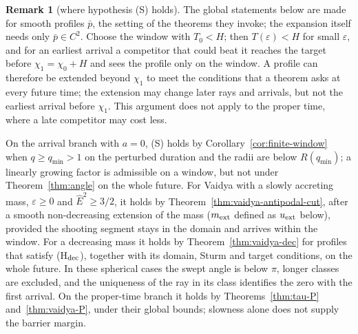 \documentclass[aip,jmp,amsmath,amssymb,reprint]{revtex4-2}
\newcommand{\Ehat}{\hat E}
\theoremstyle{plain}
\theoremstyle{definition}
\newtheorem{remark}[proposition]{Remark}
\begin{document}
\begin{remark}[where hypothesis (S) holds]\label{rmk:adiabatic-selection}
The global statements below are made for smooth profiles $\bar p$, the setting of the theorems they
invoke; the expansion itself needs only $\bar p\in C^2$. Choose the window with $T_0<H$; then
$T(\varepsilon)<H$ for small $\varepsilon$, and for an earliest arrival a competitor that could beat it
reaches the target before $\chi_1=\chi_0+H$ and sees the profile only on the window. A profile can
therefore be extended beyond $\chi_1$ to meet the conditions that a theorem asks at every future
time; the extension may change later rays and arrivals, but not the earliest arrival before
$\chi_1$. This argument does not apply to the proper time, where a late competitor may cost less.

On the arrival branch with $a=0$, (S) holds by Corollary~\ref{cor:finite-window} when $q\ge q_{\min}>1$
on the perturbed duration and the radii are below $R(q_{\min})$; a linearly growing factor is
admissible on a window, but not under Theorem~\ref{thm:angle} on the whole future. For Vaidya with
a slowly accreting mass, $\varepsilon\ge0$ and $\Ehat^2\ge3/2$, it holds by
Theorem~\ref{thm:vaidya-antipodal-cut}, after a smooth non-decreasing extension of the mass
($m_{\rm ext}$ defined as $u_{\rm ext}$ below), provided the shooting segment stays in the domain and
arrives within the window. For a decreasing mass it holds by Theorem~\ref{thm:vaidya-dec} for
profiles that satisfy (H$_{\rm dec}$), together with its domain, Sturm and target conditions, on
the whole future. In these spherical cases the swept angle is below $\pi$, longer classes are
excluded, and the uniqueness of the ray in its class identifies the zero with the first arrival.
On the proper-time branch it holds by Theorems~\ref{thm:tau-P} and~\ref{thm:vaidya-P}, under their
global bounds; slowness alone does not supply the barrier margin.


\end{remark}
\end{document}
